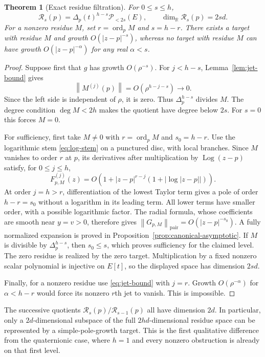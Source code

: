 \documentclass[11pt,a4paper]{article}
\numberwithin{equation}{section}
\newtheorem{theorem}{Theorem}[section]
\theoremstyle{definition}
\theoremstyle{remark}
\newcommand{\R}{\mathbb R}
\newcommand{\PPl}[1]{\mathscr P_{<#1}(E)}
\newcommand{\ord}{\operatorname{ord}}
\newcommand{\norm}[1]{\left\lVert#1\right\rVert}
\begin{document}
\begin{theorem}[Exact residue filtration]\label{thm:filtration}
For $0\le s\le h$,
\begin{equation}\label{eq:filtration}
 \mathcal R_s(p)=\Delta_p(t)^{h-s}\PPl{2s},
 \qquad \dim_{\R}\mathcal R_s(p)=2sd.
\end{equation}
For a nonzero residue $M$, set $r=\ord_pM$ and $s=h-r$. There exists a target
with residue $M$ and growth $O(|z-p|^{-s})$, whereas no target with residue $M$
can have growth $O(|z-p|^{-\alpha})$ for any real $\alpha<s$.
\end{theorem}

\begin{proof}
Suppose first that $g$ has growth $O(\rho^{-s})$. For $j<h-s$,
Lemma~\ref{lem:jet-bound} gives
\[
 \norm{M^{(j)}(p)}=O(\rho^{h-j-s})\longrightarrow0.
\]
Since the left side is independent of $\rho$, it is zero. Thus
$\Delta_p^{h-s}$ divides $M$. The degree condition $\deg M<2h$ makes the
quotient have degree below $2s$. For $s=0$ this forces $M=0$.

For sufficiency, first take $M\ne0$ with $r=\ord_pM$ and $s_0=h-r$.
Use the logarithmic stem \eqref{eq:log-stem} on a punctured disc, with local
branches. Since $M$ vanishes to order $r$ at $p$, its derivatives after
multiplication by $\operatorname{Log}(z-p)$ satisfy, for $0\le j\le h$,
\[
 F_{p,M}^{(j)}(z)
 =O\!\left(1+|z-p|^{r-j}(1+|\log|z-p||)\right).
\]
At order $j=h>r$, differentiation of the lowest Taylor term gives a pole
of order $h-r=s_0$ without a logarithm in its leading term. All lower terms
have smaller order, with a possible logarithmic factor. The radial formula,
whose coefficients are smooth near $y=v>0$, therefore gives
$\norm{G_{p,M}}_{\mathrm{pair}}=O(|z-p|^{-s_0})$.
A fully normalized expansion is proved in Proposition~\ref{prop:canonical-asymptotic}.
If $M$ is divisible by $\Delta_p^{h-s}$, then $s_0\le s$, which proves
sufficiency for the claimed level. The zero residue is realized by the zero
target. Multiplication by a fixed nonzero scalar polynomial is injective on
$E[t]$, so the displayed space has dimension $2sd$.

Finally, for a nonzero residue use \eqref{eq:jet-bound} with $j=r$. Growth
$O(\rho^{-\alpha})$ for $\alpha<h-r$ would force its nonzero $r$th jet to
vanish. This is impossible.
\end{proof}

The successive quotients
$\mathcal R_s(p)/\mathcal R_{s-1}(p)$ all have dimension $2d$. In particular,
only a $2d$-dimensional subspace of the full $2hd$-dimensional residue space
can be represented by a simple-pole-growth target. This is the first
qualitative difference from the quaternionic case, where $h=1$ and every
nonzero obstruction is already on that first level.
\end{document}
